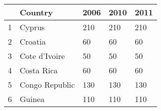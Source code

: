 \begin{tabular}{lllll}
\toprule
 & Country  & 2006  & 2010  & 2011  \\
\midrule
1 & Cyprus  & 210  & 210  & 210  \\
2 & Croatia  & 60  & 60  & 60  \\
3 & Cote d'Ivoire  & 50  & 50  & 50  \\
4 & Costa Rica  & 60  & 60  & 60  \\
5 & Congo Republic  & 130  & 130  & 130  \\
6 & Guinea  & 110  & 110  & 110  \\
\bottomrule
\end{tabular}
